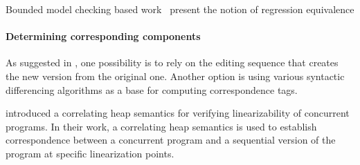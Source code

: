 Bounded model checking based work~\cite{GodlinStrichman09} present the notion of regression equivalence

\cite{JacksonLadd94} 



\paragraph{Determining corresponding components}

As suggested in \cite{Horwitz:PLDI90}, one possibility is to rely on the editing sequence that creates the new version from the original one. Another option is using various syntactic differencing algorithms as a base for computing correspondence tags.


\cite{ARRSY:CAV07} introduced a correlating heap semantics for verifying linearizability of concurrent programs. In their work, a correlating heap semantics is used to establish correspondence between a concurrent program and a sequential version of the program at specific linearization points.  